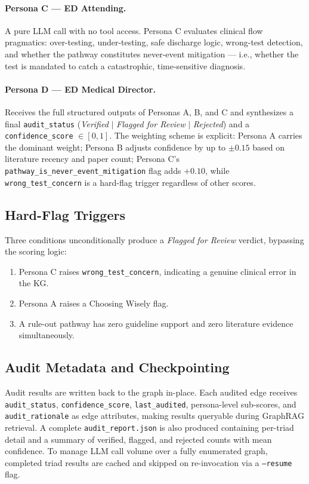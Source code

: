 \documentclass[pmlr]{jmlr}%
\begin{document}
\paragraph{Persona C — ED Attending.}
A pure LLM call with no tool access. Persona C evaluates clinical flow pragmatics:
over-testing, under-testing, safe discharge logic, wrong-test detection, and whether the pathway constitutes never-event mitigation — i.e., whether the test is mandated to catch a catastrophic, time-sensitive diagnosis.

\paragraph{Persona D — ED Medical Director.}
Receives the full structured outputs of Personas A, B, and C and synthesizes a final \texttt{audit\_status} (\textit{Verified} $|$ \textit{Flagged for Review} $|$ \textit{Rejected}) and a \texttt{confidence\_score} $\in [0, 1]$. The weighting scheme is explicit: Persona A carries the dominant weight; Persona B adjusts confidence by up to $\pm 0.15$ based on literature recency and paper count; Persona C's \texttt{pathway\_is\_never\_event\_mitigation} flag adds $+0.10$, while \texttt{wrong\_test\_concern} is a hard-flag trigger regardless of other scores.

\subsection*{Hard-Flag Triggers}
Three conditions unconditionally produce a \textit{Flagged for Review} verdict, bypassing
the scoring logic:
\begin{enumerate}
    \item Persona C raises \texttt{wrong\_test\_concern}, indicating a genuine clinical
    error in the KG.
    \item Persona A raises a Choosing Wisely flag.
    \item A rule-out pathway has zero guideline support and zero literature evidence
    simultaneously.
\end{enumerate}

\subsection*{Audit Metadata and Checkpointing}
Audit results are written back to the graph in-place. Each audited edge receives
\texttt{audit\_status}, \texttt{confidence\_score}, \texttt{last\_audited}, persona-level
sub-scores, and \texttt{audit\_rationale} as edge attributes, making results queryable
during GraphRAG retrieval. A complete \texttt{audit\_report.json} is also produced
containing per-triad detail and a summary of verified, flagged, and rejected counts with
mean confidence. To manage LLM call volume over a fully enumerated graph, completed
triad results are cached and skipped on re-invocation via a \texttt{--resume} flag.
\end{document}
